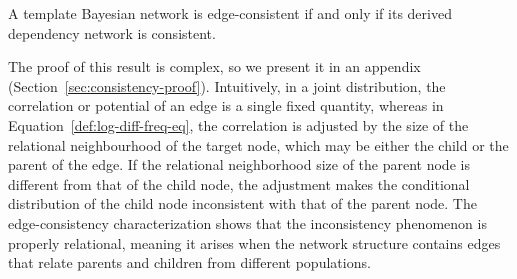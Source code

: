\documentclass[runningheads,a4paper]{llncs}
\begin{document}
\begin{theorem}\label{th:consistent-dn}
A template Bayesian network is edge-consistent if and only if its derived dependency network is consistent.
\end{theorem}

%
%

The proof of this result is complex, so we present it in an appendix (Section~\ref{sec:consistency-proof}). Intuitively, in a joint distribution, the correlation or potential of an edge 
is a single fixed quantity, whereas in Equation~\eqref{def:log-diff-freq-eq}, the correlation is adjusted by the size of the relational neighbourhood  of the target node, which may be either the child or the parent of the edge. If the relational neighborhood size of the parent node is different from that of the child node, the adjustment makes the conditional distribution of the child node inconsistent with that of the parent node. The edge-consistency characterization shows that the inconsistency phenomenon is properly relational, meaning it arises when the network structure contains edges that relate parents and children from different populations.

%
\end{document}
